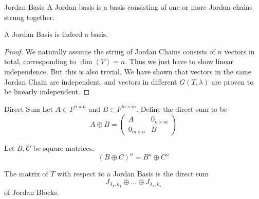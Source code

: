\begin{defn}{Jordan Basis}{} A Jordan basis is a basis consisting of one or more Jordan chains strung together. 
\end{defn}

\begin{lmm}{}{} A Jordan Basis is indeed a basis. \tcbline
\begin{proof} We naturally assume the string of Jordan Chains consists of $n$ vectors in total, corresponding to $\dim(V)=n$. Thus we just have to show linear independence. But this is also trivial. We have shown that vectors in the same Jordan Chain are independent, and vectors in different $G(T,\lambda)$ are proven to be linearly independent. 
\end{proof}
\end{lmm}

\begin{defn}{Direct Sum}{} Let $A\in F^{n\times n}$ and $B\in F^{m\times m}$. Define the direct sum to be $$A\oplus B=\begin{pmatrix}
A & 0_{n\times m}\\
0_{m\times n} & B
\end{pmatrix}$$
\end{defn}

\begin{lmm}{}{} Let $B,C$ be square matrices. $$(B\oplus C)^n=B^n\oplus C^n$$
\end{lmm}

\begin{crl}{}{} The matrix of $T$ with respect to a Jordan Basis is the direct sum $$J_{\lambda_1,k_1}\oplus\dots\oplus J_{\lambda_s,k_s}$$ of Jordan Blocks. 
\end{crl}

